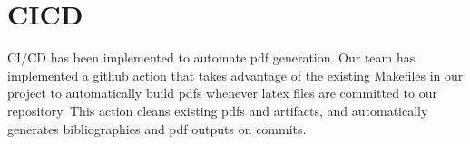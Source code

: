 \documentclass{article}
\begin{document}

\newpage
\section{CICD}

CI/CD has been implemented to automate pdf generation. Our team has implemented a github action that takes advantage of the existing Makefiles in our project to automatically build pdfs whenever latex files are committed to our repository. This action cleans existing pdfs and artifacts, and automatically generates bibliographies and pdf outputs on commits.
\end{document}

